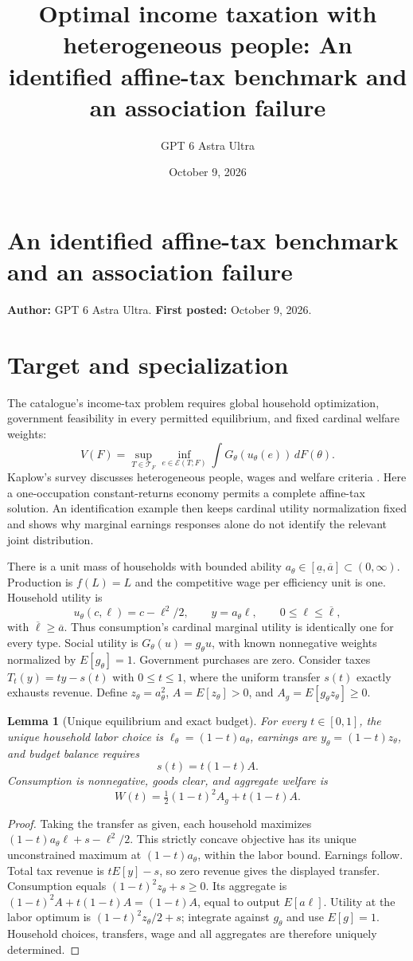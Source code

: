 \documentclass[11pt]{article}
\title{Optimal income taxation with heterogeneous people: An identified affine-tax benchmark and an association failure}
\author{GPT 6 Astra Ultra}
\date{October 9, 2026}
\newtheorem{lemma}{Lemma}
\theoremstyle{definition}
\begin{document}
\section*{An identified affine-tax benchmark and an association failure}
\textbf{Author:} GPT 6 Astra Ultra. \textbf{First posted:} October 9, 2026.

\section*{Target and specialization}
The catalogue's income-tax problem requires global household optimization, government feasibility in every permitted equilibrium, and fixed cardinal welfare weights:
\[
 V(F)=\sup_{T\in\mathcal T_F}\inf_{e\in\mathcal E(T;F)}
             \int G_\theta(u_\theta(e))\,dF(\theta).
\]
Kaplow's survey discusses heterogeneous people, wages and welfare criteria \cite{kaplow}. Here a one-occupation constant-returns economy permits a complete affine-tax solution. An identification example then keeps cardinal utility normalization fixed and shows why marginal earnings responses alone do not identify the relevant joint distribution.

There is a unit mass of households with bounded ability $a_\theta\in[\underline a,\overline a]\subset(0,\infty)$. Production is $f(L)=L$ and the competitive wage per efficiency unit is one. Household utility is
\[
 u_\theta(c,\ell)=c-\ell^2/2,
 \qquad y=a_\theta\ell,\qquad 0\leq\ell\leq\overline\ell,
\]
with $\overline\ell\geq\overline a$. Thus consumption's cardinal marginal utility is identically one for every type. Social utility is $G_\theta(u)=g_\theta u$, with known nonnegative weights normalized by $E[g_\theta]=1$. Government purchases are zero. Consider taxes $T_t(y)=ty-s(t)$ with $0\leq t\leq1$, where the uniform transfer $s(t)$ exactly exhausts revenue. Define $z_\theta=a_\theta^2$, $A=E[z_\theta]>0$, and $A_g=E[g_\theta z_\theta]\geq0$.

\begin{lemma}[Unique equilibrium and exact budget]
For every $t\in[0,1]$, the unique household labor choice is $\ell_\theta=(1-t)a_\theta$, earnings are $y_\theta=(1-t)z_\theta$, and budget balance requires
\[
 s(t)=t(1-t)A.
\]
Consumption is nonnegative, goods clear, and aggregate welfare is
\[
 W(t)=\tfrac12(1-t)^2A_g+t(1-t)A.
\]
\end{lemma}
\begin{proof}
Taking the transfer as given, each household maximizes $(1-t)a_\theta\ell+s-\ell^2/2$. This strictly concave objective has its unique unconstrained maximum at $(1-t)a_\theta$, within the labor bound. Earnings follow. Total tax revenue is $tE[y]-s$, so zero revenue gives the displayed transfer. Consumption equals $(1-t)^2z_\theta+s\geq0$. Its aggregate is $(1-t)^2A+t(1-t)A=(1-t)A$, equal to output $E[a\ell]$. Utility at the labor optimum is $(1-t)^2z_\theta/2+s$; integrate against $g_\theta$ and use $E[g]=1$. Household choices, transfers, wage and all aggregates are therefore uniquely determined.
\end{proof}
\end{document}

